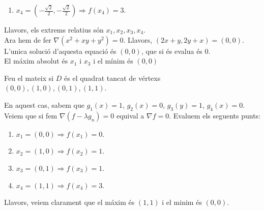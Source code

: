 \documentclass[a4paper, 12pt]{article}
\begin{document}
\begin{solucio}
\begin{enumerate}
            \item $x_4 = \left(-\frac{\sqrt{2}}{2}, -\frac{\sqrt{2}}{2}\right) \Rightarrow f(x_4) = 3.$
        \end{enumerate}
        Llavors, els extrems relatius són $x_1, x_2, x_3, x_4$.\\
        Ara hem de fer $\nabla\left(x^2+xy+y^2\right) = 0$. Llavors, $\left(2x+y, 2y+x\right) = \left(0, 0\right)$.\\
        L'unica solució d'aquesta equació és $\left(0,0\right)$, que si és evalua és $0$.\\
        El máxim absolut és $x_1$ i $x_3$ i el mínim és $\left(0,0\right)$
    \end{solucio}

    \begin{exercici}
        Feu el mateix si $D$ és el quadrat tancat de vértexs $\left(0,0\right),\left(1,0\right),\left(0,1\right),\left(1,1\right)$.
    \end{exercici}
    \begin{solucio}
        En aquest cas, sabem que $g_1(x) = 1$, $g_2(x) = 0$, $g_3(y) = 1$, $g_4(x) = 0$.\\
        Veiem que si fem $\nabla\left(f-\lambda g_n\right) = 0$ equival a $\nabla f = 0$. Evaluem
        els seguents punts:
        \begin{enumerate}
            \item $x_1 = \left(0, 0\right) \Rightarrow f(x_1) = 0.$
            \item $x_2 = \left(1, 0\right) \Rightarrow f(x_2) = 1.$
            \item $x_3 = \left(0, 1\right) \Rightarrow f(x_3) = 1.$
            \item $x_4 = \left(1, 1\right) \Rightarrow f(x_4) = 3.$
        \end{enumerate}
        Llavors, veiem clarament que el máxim és $\left(1,1\right)$ i el minim és $\left(0,0\right)$.
    \end{solucio}
\end{document}
